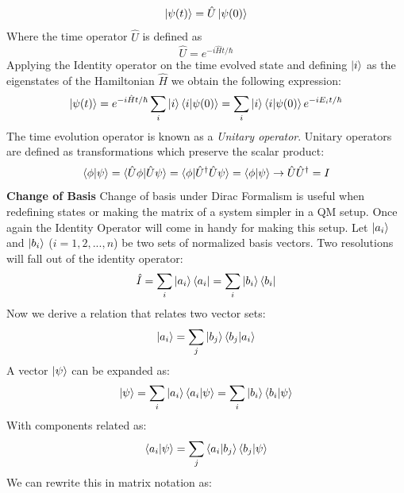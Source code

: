 \begin{equation}
    \ket{\psi (t)} = \hat{U}\ket{\psi(0)}
\end{equation}
Where the time operator $\hat{U}$ is defined as 
\begin{equation}
    \hat{U} = e^{-i \hat{H}t/\hbar}
\end{equation}
Applying the Identity operator on the time evolved state and defining $\ket{i}$ as the eigenstates of the Hamiltonian $\hat{H}$ we obtain the following expression:
\begin{equation}
    \ket{\psi (t)} = e^{-i\hat{H}t/\hbar} \sum_{i} \ket{i}\braket{i|\psi(0)} = \sum_{i} \ket{i}\braket{i|\psi(0)}e^{-iE_{i}t/\hbar}
\end{equation}
The time evolution operator is known as a \textit{Unitary operator}. Unitary operators are defined as transformations which preserve the scalar product:
\begin{equation}
    \braket{\phi|\psi} = \braket{\hat{U}\phi|\hat{U}\psi} = \braket{\phi|\hat{U}^{\dagger}\hat{U}\psi} = \braket{\phi|\psi} \rightarrow \hat{U}\hat{U}^{\dagger} = I
\end{equation}
\textbf{Change of Basis} \newline
Change of basis under Dirac Formalism is useful when redefining states or making the matrix of a system simpler in a QM setup. Once again the Identity Operator will come in handy for making this setup. \newline
Let $\ket{a_{i}}$ and $\ket{b_{i}}$ ($i = 1,2,...,n$) be two sets of normalized basis vectors. Two resolutions will fall out of the identity operator: 
\begin{equation}
    \hat{I} = \sum_{i} \ket{a_{i}}\bra{a_{i}} = \sum_{i} \ket{b_{i}}\bra{b_{i}}
\end{equation}
Now we derive a relation that relates two vector sets:
\begin{equation}
    \ket{a_{i}} = \sum_{j} \ket{b_{j}}\braket{b_{j}|a_{i}}
\end{equation}
A vector $\ket{\psi}$ can be expanded as:
\begin{equation}
    \ket{\psi} = \sum_{i} \ket{a_{i}}\braket{a_{i}|\psi} = \sum_{i} \ket{b_{i}}\braket{b_{i}|\psi}
\end{equation}
With components related as: 
\begin{equation}
    \braket{a_{i}|\psi} = \sum_{j} \braket{a_{i}|b_{j}}\braket{b_{j}|\psi}
\end{equation}
We can rewrite this in matrix notation as: 
